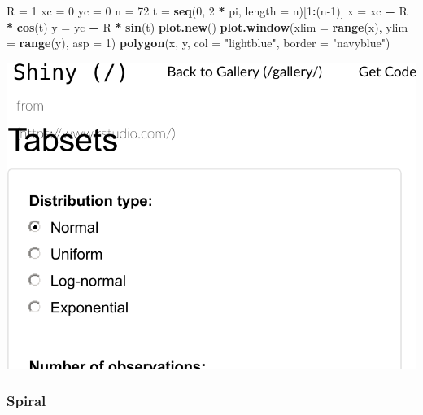 \documentclass[]{book}
\newenvironment{Shaded}{\begin{snugshade}}{\end{snugshade}}
\newcommand{\DataTypeTok}[1]{\textcolor[rgb]{0.13,0.29,0.53}{#1}}
\newcommand{\DecValTok}[1]{\textcolor[rgb]{0.00,0.00,0.81}{#1}}
\newcommand{\KeywordTok}[1]{\textcolor[rgb]{0.13,0.29,0.53}{\textbf{#1}}}
\newcommand{\NormalTok}[1]{#1}
\newcommand{\OperatorTok}[1]{\textcolor[rgb]{0.81,0.36,0.00}{\textbf{#1}}}
\newcommand{\StringTok}[1]{\textcolor[rgb]{0.31,0.60,0.02}{#1}}
\theoremstyle{definition}
\theoremstyle{definition}
\theoremstyle{definition}
\theoremstyle{remark}
\begin{document}
\begin{Shaded}
\begin{Highlighting}[]
\NormalTok{R =}\StringTok{ }\DecValTok{1}
\NormalTok{xc =}\StringTok{ }\DecValTok{0}
\NormalTok{yc =}\StringTok{ }\DecValTok{0}
\NormalTok{n =}\StringTok{ }\DecValTok{72}
\NormalTok{t =}\StringTok{ }\KeywordTok{seq}\NormalTok{(}\DecValTok{0}\NormalTok{, }\DecValTok{2} \OperatorTok{*}\StringTok{ }\NormalTok{pi, }\DataTypeTok{length =}\NormalTok{ n)[}\DecValTok{1}\OperatorTok{:}\NormalTok{(n}\DecValTok{-1}\NormalTok{)]}
\NormalTok{x =}\StringTok{ }\NormalTok{xc }\OperatorTok{+}\StringTok{ }\NormalTok{R }\OperatorTok{*}\StringTok{ }\KeywordTok{cos}\NormalTok{(t)}
\NormalTok{y =}\StringTok{ }\NormalTok{yc }\OperatorTok{+}\StringTok{ }\NormalTok{R }\OperatorTok{*}\StringTok{ }\KeywordTok{sin}\NormalTok{(t)}
\KeywordTok{plot.new}\NormalTok{()}
\KeywordTok{plot.window}\NormalTok{(}\DataTypeTok{xlim =} \KeywordTok{range}\NormalTok{(x), }\DataTypeTok{ylim =} \KeywordTok{range}\NormalTok{(y), }\DataTypeTok{asp =} \DecValTok{1}\NormalTok{)}
\KeywordTok{polygon}\NormalTok{(x, y, }\DataTypeTok{col =} \StringTok{"lightblue"}\NormalTok{, }\DataTypeTok{border =} \StringTok{"navyblue"}\NormalTok{)}
\end{Highlighting}
\end{Shaded}

\includegraphics[width=0.5\linewidth]{Rcourse_files/figure-latex/unnamed-chunk-266-1}

\hypertarget{spiral}{%
\subsubsection{Spiral}\label{spiral}}
\end{document}
